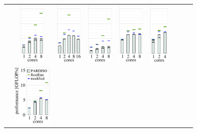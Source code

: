 \begin{tabular}{lcccccccc}
  & 
  \includegraphics[height=3.0cm,clip=true]{images/perf/p-80/p-meggie-n-70-b-1}%
  & 
  \includegraphics[height=3.0cm,clip=true]{images/perf/p-80/p-skylakesp2-n-70-b-1}%
  & 
  \includegraphics[height=3.0cm,clip=true]{images/perf/p-80/p-knightmare1-n-70-b-1}%
  & 
  \includegraphics[height=3.0cm,clip=true]{images/perf/p-80/p-summitridge1-n-70-b-1}%
  & 
  \includegraphics[height=3.0cm,clip=true]{images/perf/p-80/p-naples1-n-70-b-1}%
\\
 \raisebox{1.70cm}{\rotatebox[origin=c]{90}{bddc1}} &
  \includegraphics[height=3.0cm,clip=true]{images/perf/p-80/p-emmy-mat_Kii_sd22_size750141_load2_newton1}%

\end{tabular}
